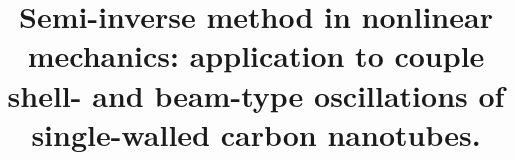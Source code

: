 %
%
%
%
%
%
\RequirePackage{fix-cm}
%
\documentclass[smallextended]{svjour3}       %
%
\smartqed  %
%
\usepackage{graphicx}
%
%
%
%
 \journalname{}%
%


\title{Semi-inverse method in nonlinear mechanics: application to couple shell- and beam-type oscillations of single-walled carbon nanotubes.
}


